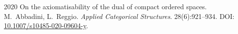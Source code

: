 \pubrow
  {2020}
  {On the axiomatisability of the dual of compact ordered spaces.}
  {M.\ Abbadini, L.\ Reggio.}
  {\emph{Applied Categorical Structures}. 28(6):921--934. DOI: \href{https://doi.org/10.1007/s10485-020-09604-y}{10.1007/s10485-020-09604-y}.}
